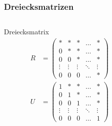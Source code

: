 %
%
%
\begin{frame}[t]
\frametitle{Dreiecksmatrizen}
\vspace{-10pt}
\begin{columns}[t,onlytextwidth]
\begin{column}{0.31\textwidth}
\begin{block}{Dreiecksmatrix}
\begin{align*}
R&=
\begin{pmatrix}
*&*&*&\dots&*\\
0&*&*&\dots&*\\
0&0&*&\dots&*\\
\vdots&\vdots&\vdots&\ddots&\vdots\\
0&0&0&\dots&*
\end{pmatrix}
\\
U&=
\begin{pmatrix}
1&*&*&\dots&*\\
0&1&*&\dots&*\\
0&0&1&\dots&*\\
\vdots&\vdots&\vdots&\ddots&\vdots\\
0&0&0&\dots&1
\end{pmatrix}
\end{align*}
\end{block}
\end{column}
\begin{column}{0.31\textwidth}
\end{column}
\begin{column}{0.31\textwidth}
\end{column}
\end{columns}
\end{frame}
